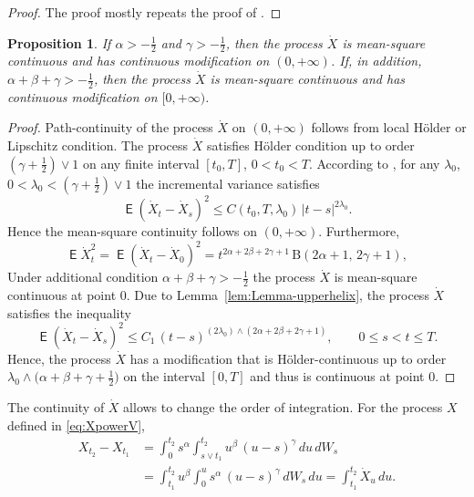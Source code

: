 \documentclass{article}
\DeclareMathOperator{\ME}{\mathsf{E}}
\newcommand{\dotX}{\dot{X}}
\theoremstyle{plain}
\newtheorem{prop}{Proposition}
\theoremstyle{remark}
\theoremstyle{definition}
\begin{document}
\begin{proof}
The proof mostly repeats the proof of \cite[Lemma 2]{Part 1}.
\end{proof}

\begin{prop}
If $\alpha>-\frac12$ and $\gamma>-\frac12$,
then the process $\dotX$ is mean-square continuous
and has continuous modification on $(0,+\infty)$.
If, in addition, $\alpha+\beta+\gamma>-\frac12$,
then the process $\dotX$ is mean-square continuous
and has continuous modification on $[0,+\infty)$.
\end{prop}

\begin{proof}
Path-continuity of the process $\dotX$ on $(0,+\infty)$
follows from local H\"older or Lipschitz condition.
The process $\dotX$ satisfies H\"older condition
up to order $(\gamma+\frac12)\vee 1$ on any finite
interval  $[t_0,T]$, $0<t_0<T$.
According to \cite[Theorem 1]{ASVY2014},
for any $\lambda_0$,
$0<\lambda_0 <(\gamma+\frac12)\vee 1$
the incremental variance satisfies
\[
\ME(\dotX_t - \dotX_s)^2
\le C(t_0, T, \lambda_0) \, |t-s|^{2\lambda_0} .
\]
Hence the mean-square continuity follows on $(0,+\infty)$.
Furthermore,
\[
\ME \dotX_t^2 =  \ME(\dotX_t - \dotX_0)^2 =
t^{2\alpha+2\beta+2\gamma+1} \, \mathrm{B}(2\alpha{+}1, \, 2\gamma{+}1),
\]
Under additional condition $\alpha+\beta+\gamma>-\frac12$
the process $\dotX$ is mean-square continuous at point $0$.
Due to Lemma~\ref{lem:Lemma-upperhelix},
the process $\dotX$ satisfies the inequality
\[
\ME(\dotX_t - \dotX_s)^2 \le
C_1 \, (t-s)^{(2\lambda_0) \wedge (2\alpha+2\beta+2\gamma+1)},
\qquad 0\mathbin{\le}s\mathbin{<}t\mathbin{\le}T .
\]
Hence, the process $\dotX$ has a modification that is
H\"older-continuous up to order $\lambda_0 \wedge \bigl(\alpha+\beta+\gamma+\frac12
\bigr)$ on the interval $[0,T]$ and thus is continuous at point $0$.
\end{proof}


The continuity of $\dotX$ allows to change the order of integration.
For the process $X$ defined in \eqref{eq:XpowerV},
\begin{align*}
X_{t_2}-X_{t_1}
&=
\int_0^{t_2} s^\alpha \int_{s\vee t_1}^{t_2} u^\beta \, (u-s)^\gamma \, du \, dW_s
\\ &=
\int_{t_1}^{t_2} u^\beta \int_0^u s^\alpha \, (u-s)^\gamma \, dW_s \, du
= \int_{t_1}^{t_2} \dotX_u \, du .
\end{align*}
\end{document}
